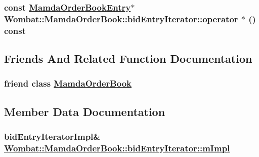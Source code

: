 \hypertarget{classWombat_1_1MamdaOrderBook_1_1bidEntryIterator_442542df25b5e0acb413522e8f1cadcd}{
\subsubsection[operator $\ast$]{\setlength{\rightskip}{0pt plus 5cm}const \hyperlink{classWombat_1_1MamdaOrderBookEntry}{Mamda\-Order\-Book\-Entry}$\ast$ Wombat::Mamda\-Order\-Book::bid\-Entry\-Iterator::operator $\ast$ () const}}
\label{classWombat_1_1MamdaOrderBook_1_1bidEntryIterator_442542df25b5e0acb413522e8f1cadcd}




\subsection{Friends And Related Function Documentation}
\hypertarget{classWombat_1_1MamdaOrderBook_1_1bidEntryIterator_51cb271c9914c74f99c60cb638c26be7}{
\subsubsection[MamdaOrderBook]{\setlength{\rightskip}{0pt plus 5cm}friend class \hyperlink{classWombat_1_1MamdaOrderBook}{Mamda\-Order\-Book}}}
\label{classWombat_1_1MamdaOrderBook_1_1bidEntryIterator_51cb271c9914c74f99c60cb638c26be7}




\subsection{Member Data Documentation}
\hypertarget{classWombat_1_1MamdaOrderBook_1_1bidEntryIterator_203fbd1225442e13f29f89356b167e67}{
\subsubsection[mImpl]{\setlength{\rightskip}{0pt plus 5cm}bid\-Entry\-Iterator\-Impl\& \hyperlink{classWombat_1_1MamdaOrderBook_1_1bidEntryIterator_203fbd1225442e13f29f89356b167e67}{Wombat::Mamda\-Order\-Book::bid\-Entry\-Iterator::m\-Impl}}}
\label{classWombat_1_1MamdaOrderBook_1_1bidEntryIterator_203fbd1225442e13f29f89356b167e67}


